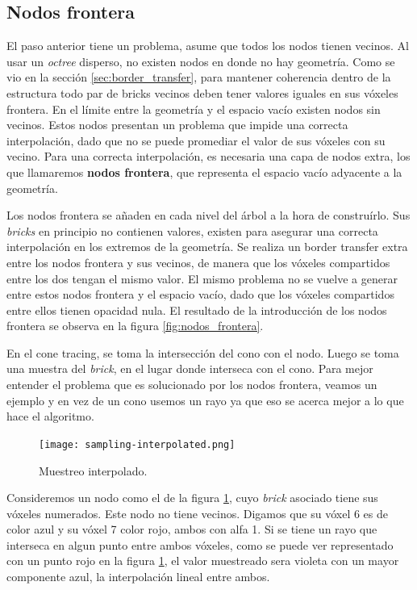 \subsection{Nodos frontera}

El paso anterior tiene un problema, asume que todos los nodos tienen vecinos.
Al usar un \textit{octree} disperso, no existen nodos en donde no hay geometría.
Como se vio en la sección \ref{sec:border_transfer}, para mantener coherencia dentro de la estructura todo par de bricks vecinos deben tener valores iguales en sus vóxeles frontera.
En el límite entre la geometría y el espacio vacío existen nodos sin vecinos.
Estos nodos presentan un problema que impide una correcta interpolación, dado que no se puede promediar el valor de sus vóxeles con su vecino.
Para una correcta interpolación, es necesaria una capa de nodos extra, los que llamaremos \textbf{nodos frontera}, que representa el espacio vacío adyacente a la geometría.

Los nodos frontera se añaden en cada nivel del árbol a la hora de construírlo.
Sus \textit{bricks} en principio no contienen valores, existen para asegurar una correcta interpolación en los extremos de la geometría.
Se realiza un border transfer extra entre los nodos frontera y sus vecinos, de manera que los vóxeles compartidos entre los dos tengan el mismo valor.
El mismo problema no se vuelve a generar entre estos nodos frontera y el espacio vacío, dado que los vóxeles compartidos entre ellos tienen opacidad nula.
El resultado de la introducción de los nodos frontera se observa en la figura \ref{fig:nodos_frontera}.

En el cone tracing, se toma la intersección del cono con el nodo.
Luego se toma una muestra del \textit{brick}, en el lugar donde interseca con el cono.
Para mejor entender el problema que es solucionado por los nodos frontera, veamos un ejemplo
y en vez de un cono usemos un rayo ya que eso se acerca mejor a lo que hace el algoritmo.

\begin{figure}[h!]
    \centering
    \texttt{[image: sampling-interpolated.png]}
    \caption{Muestreo interpolado.}
    \label{fig:muestreo-interpolado}
\end{figure}

Consideremos un nodo como el de la figura \ref*{fig:muestreo-interpolado}, cuyo \textit{brick} asociado tiene sus vóxeles numerados.
Este nodo no tiene vecinos.
Digamos que su vóxel 6 es de color azul y su vóxel 7 color rojo, ambos con alfa 1.
Si se tiene un rayo que interseca en algun punto entre ambos vóxeles, como se puede ver representado con un punto rojo en la figura \ref{fig:muestreo-interpolado}, el valor muestreado sera violeta con un mayor componente azul, la interpolación lineal entre ambos.

